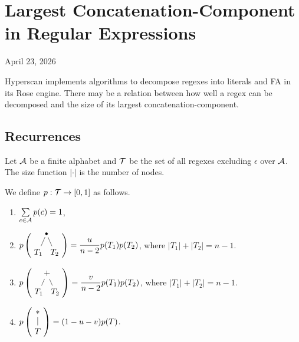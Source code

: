 \chapter{Largest Concatenation-Component in Regular Expressions}

\begin{center}
  April 23, 2026
  \vspace{0.5cm}
\end{center}

Hyperscan implements algorithms to decompose regexes into literals and FA in its Rose engine. There may be a relation between how well a regex can be decomposed and the size of its largest concatenation-component.

\section{Recurrences}

Let $\mathcal{A}$ be a finite alphabet and $\mathcal{T}$ be the set of all regexes excluding $\epsilon$ over $\mathcal{A}$. The size function $|\cdot|$ is the number of nodes.

\begin{definition}
  We define $p:\mathcal{T} \to [0,1]$ as follows.
  \begin{enumerate}
    \item $\sum\limits_{c\in\mathcal{A}}p(c) = 1$,
    \item $p\left(\vcenter{\hbox{\begin{tikzpicture}[level distance=8mm, sibling distance=7mm, edge from parent/.style={draw, shorten <=1mm}]
                  \node[circle, draw, fill=black, minimum size=1mm, inner sep=0pt] {}
                  child { node {$T_1$} }
                  child { node {$T_2$} };
                \end{tikzpicture}}}\right) = \dfrac{u}{n-2} p(T_1)p(T_2)$, where $|T_1| + |T_2| = n-1$.
    \item $p\left(\vcenter{\hbox{\begin{tikzpicture}[level distance=8mm, sibling distance=7mm]
                  \node{$+$}
                  child { node {$T_1$} }
                  child { node {$T_2$} };
                \end{tikzpicture}}}\right) = \dfrac{v}{n-2} p(T_1)p(T_2)$, where $|T_1| + |T_2| = n-1$.
    \item $p\left(\vcenter{\hbox{\begin{tikzpicture}[level distance=8mm, sibling distance=7mm]
                  \node{$*$}
                  child { node {$T$} };
                \end{tikzpicture}}}\right) = (1-u-v) p(T)$.
  \end{enumerate}
\end{definition}

